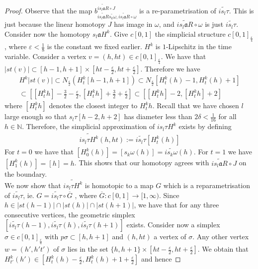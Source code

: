 \documentclass[a4paper,11pt]{article}
\theoremstyle{definition}
\theoremstyle{plain}
\theoremstyle{remark}
\begin{document}
{\begin{proof}
Observe that the map $ b^{\widetilde{i  s_{l} \mathfrak{a}R} \circ J}_{\widetilde{i  s_{l} \mathfrak{a}R} \widetilde{s_{k}\omega},\widetilde{i  s_{l}\mathfrak{a} R} \circ \omega}$ is a re-parametrisation of $\widetilde{is_{l}\tau}$. 
This is just because the linear homotopy $J$ has image in $\omega$, and $\widetilde{is_{l}\mathfrak{a}R}\circ \omega$ is just $\widetilde{is_{l}\tau}$. Consider now the homotopy $s_{l}\mathfrak{a}H^{k}$. Give $c[0,1]$ the simplicial structure $c[0,1]_{\frac{\varepsilon}{4}}$, where $\varepsilon<\frac{1}{8}$ is the constant we fixed earlier. $H^{k}$ is $1$-Lipschitz in the time variable. Consider a vertex $v=(h,ht)\in c[0,1]_{\frac{\varepsilon}{4}}$. We have that $|st(v)|\subset [h-1,h+1]\times [ht-\frac{\varepsilon}{2}, ht+\frac{\varepsilon}{2}]$. Therefore we have 
\begin{align*}
 H^{k}|st(v)|\subset N_{\frac{\varepsilon}{2}}(H^{k}_{t} [h-1,h+1])\subset N_{\frac{\varepsilon}{2}}[H^{k}_{t}(h)-1,H^{k}_{t}(h)+1]\\
\subset [[H^{k}_{t}h]-\frac{3}{2}-\frac{\varepsilon}{2},[H^{k}_{t}h]+\frac{3}{2}+\frac{\varepsilon}{2}] \subset [[H^{k}_{t}h]-2,[H^{k}_{t}h]+2]
\end{align*}
where $[H^{k}_{t}h]$ denotes the closest integer to $H^{k}_{t}h$. Recall that we have chosen $l$ large enough so that $s_{l}\tau [h-2,h+2]$ has diameter less than $2\delta <\frac{1}{16}$ for all $h\in \mathbb{N}$. Therefore, the simplicial approximation of $is_{l}\tau H^{k}$ exists by defining 
\begin{align*}
\widetilde{is_{l}\tau H^{k}}(h,ht) := \widetilde{is_{l}\tau} [H^{k}_{t}(h)]
\end{align*}
For $t=0$ we have that $[H^{k}_{0}(h)] = [s_{k}\omega(h)] = \widetilde{is_{k}\omega}(h)$. For $t=1$ we have $[H^{k}_{1}(h)] = [h] = h$. This shows that our homotopy agrees with $\widetilde{is_{l}\mathfrak{a}R}\circ J$ on the boundary.\\

We now show that $\widetilde{is_{l}\tau H^{k}}$ is homotopic to a map $G$ which is a reparametrisation of $\widetilde{is_{l}\tau}$, ie. $G = \widetilde{is_{l}\tau} \circ \overline{G}$ , where $\overline{G}: c[0,1]\rightarrow [1,\infty)$. Since $h\in  |st(h-1)|\cap |st(h)|\cap  |st(h+1)|$, we have that for any three consecutive vertices, the geometric simplex $[\widetilde{is_{l}\tau}(h-1),\widetilde{is_{l}\tau}(h), \widetilde{is_{l}\tau}(h+1)]$ exists. Consider now a simplex $\sigma\in c[0,1]_{\frac{\varepsilon}{4}}$ with $p\sigma\subset [h,h+1]$ and $(h,ht)$ a vertex of $\sigma$. Any other vertex $w=(h', h't')$ of $\sigma$ lies in the set $\{h,h+1\} \times[ht-\frac{\varepsilon}{2}, ht+\frac{\varepsilon}{2}]$. We obtain that $H^k_{t'}(h')\in [H^k_{t}(h)-\frac{\varepsilon}{2}, H^k_{t}(h)+1+\frac{\varepsilon}{2}]$ and hence


\end{proof}}
\end{document}
